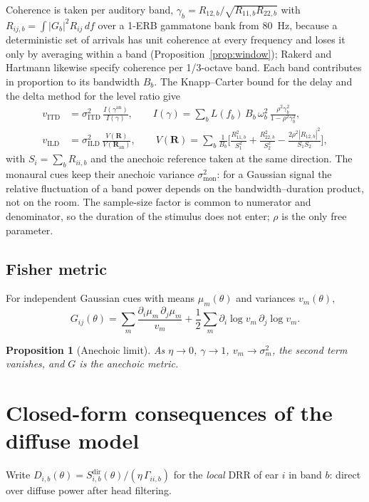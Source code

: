 \documentclass[10pt]{article}
\newtheorem{proposition}{Proposition}
\theoremstyle{definition}
\begin{document}
Coherence is taken per auditory band, $\gamma_b=R_{12,b}/\sqrt{R_{11,b}R_{22,b}}$ with $R_{ij,b}=\int|G_b|^2R_{ij}\,df$ over a 1-ERB gammatone bank from 80~Hz, because a deterministic set of arrivals has unit coherence at every frequency and loses it only by averaging within a band (Proposition~\ref{prop:window}); Rakerd and Hartmann likewise specify coherence per 1/3-octave band. Each band contributes in proportion to its bandwidth $B_b$. The Knapp--Carter bound for the delay and the delta method for the level ratio give
\begin{align}
v_{\mathrm{ITD}}&=\sigma_{\mathrm{ITD}}^2\,\frac{I(\gamma^{\mathrm{an}})}{I(\gamma)},\qquad I(\gamma)=\sum_b L(f_b)\,B_b\,\omega_b^2\,\frac{\rho^2\gamma_b^2}{1-\rho^2\gamma_b^2},\\
v_{\mathrm{ILD}}&=\sigma_{\mathrm{ILD}}^2\,\frac{V(\bm R)}{V(\bm R_{\mathrm{an}})},\qquad
V(\bm R)=\sum_b\frac{1}{B_b}\Big[\tfrac{R_{11,b}^2}{S_1^2}+\tfrac{R_{22,b}^2}{S_2^2}-\tfrac{2\rho^2|R_{12,b}|^2}{S_1S_2}\Big],
\end{align}
with $S_i=\sum_bR_{ii,b}$ and the anechoic reference taken at the same direction.
The monaural cues keep their anechoic variance $\sigma_{\mathrm{mon}}^2$: for a Gaussian signal the relative fluctuation of a band power depends on the bandwidth--duration product, not on the room. The sample-size factor is common to numerator and denominator, so the duration of the stimulus does not enter; $\rho$ is the only free parameter.

\subsection{Fisher metric}
For independent Gaussian cues with means $\mu_m(\theta)$ and variances $v_m(\theta)$,
\begin{equation}
G_{ij}(\theta)=\sum_m\frac{\partial_i\mu_m\,\partial_j\mu_m}{v_m}+\frac12\sum_m\partial_i\log v_m\,\partial_j\log v_m .
\label{eq:G}
\end{equation}
\begin{proposition}[Anechoic limit]
As $\eta\to0$, $\gamma\to1$, $v_m\to\sigma_m^2$, the second term vanishes, and $G$ is the anechoic metric.
\end{proposition}

\section{Closed-form consequences of the diffuse model}

Write $D_{i,b}(\theta)=S^{\mathrm{dir}}_{i,b}(\theta)/(\eta\,\Gamma_{ii,b})$ for the \emph{local} DRR of ear $i$ in band $b$: direct over diffuse power after head filtering.
\end{document}
